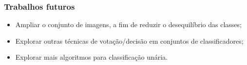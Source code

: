 \documentclass[t]{beamer}
\begin{document}
\begin{frame}[c]
	\frametitle{Trabalhos futuros}

	\begin{itemize}
		\item Ampliar o conjunto de imagens, a fim de reduzir o desequilíbrio das classes;
		\item Explorar outras técnicas de votação/decisão em conjuntos de classificadores;
		\item Explorar mais algoritmos para classificação unária.
	\end{itemize}
\end{frame}



%	
%	
\end{document}
